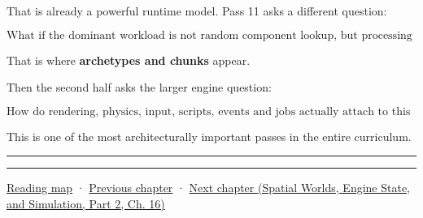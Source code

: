 That is already a powerful runtime model. Pass 11 asks a different question:

\[
\boxed{
\text{What if the dominant workload is not random component lookup, but processing huge groups of identically shaped entities?}
}
\]

That is where \textbf{archetypes and chunks} appear.

Then the second half asks the larger engine question:

\[
\boxed{
\text{How do rendering, physics, input, scripts, events and jobs actually attach to this ECS without destroying its data-oriented properties?}
}
\]

This is one of the most architecturally important passes in the entire curriculum.

\begin{center}\rule{0.5\linewidth}{0.5pt}\end{center}

\begin{center}\rule{0.5\linewidth}{0.5pt}\end{center}

\hyperref[volume-reading-map]{Reading map} · \hyperref[05-engine-i-ch014-application-clocks-and-stable-input-identity]{Previous chapter} · \href{../05-Spatial-Worlds-Engine-State-and-Simulation-P02/main.pdf\#05-engine-i-ch016-archetypes-chunks-relationships-and-transforms}{Next chapter (Spatial Worlds, Engine State, and Simulation, Part 2, Ch. 16)}
